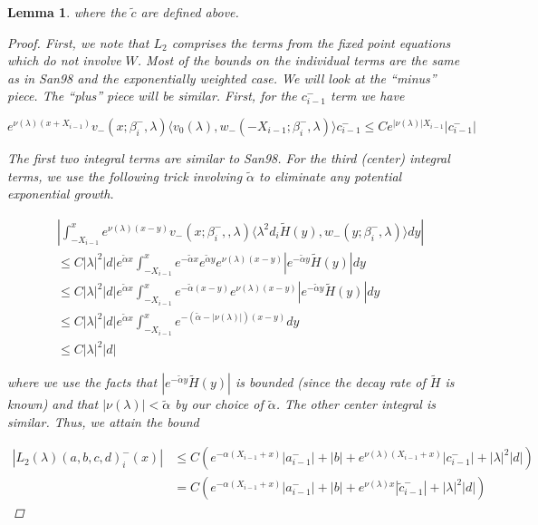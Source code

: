 \documentclass[12pt]{article}
\newtheorem{lemma}{Lemma}
\begin{document}
\begin{lemma}
where the $\tilde{c}$ are defined above.

\begin{proof}
First, we note that $L_2$ comprises the terms from the fixed point equations which do not involve $W$. Most of the bounds on the individual terms are the same as in San98 and the exponentially weighted case. We will look at the ``minus'' piece. The ``plus'' piece will be similar. First, for the $c_{i-1}^-$ term we have

\[
e^{\nu(\lambda)(x+X_{i-1})} v_-(x; \beta_i^-, \lambda) \langle v_0(\lambda), w_-(-X_{i-1}; \beta_i^-, \lambda) \rangle c_{i-1}^- \leq C e^{|\nu(\lambda)| X_{i-1} }|c_{i-1}^-|
\]

The first two integral terms are similar to San98. For the third (center) integral terms, we use the following trick involving $\tilde{\alpha}$ to eliminate any potential exponential growth.

\begin{align*}
&\left| \int_{-X_{i-1}}^x 
e^{\nu(\lambda)(x-y)} v_-(x; \beta_i^-, , \lambda) \langle \lambda^2 d_i \tilde{H}(y), w_-(y; \beta_i^-, \lambda) \rangle dy \right| \\
&\leq C |\lambda|^2 |d| e^{\tilde{\alpha}x} \int_{-X_{i-1}}^x e^{-\tilde{\alpha}x} e^{\tilde{\alpha}y} e^{\nu(\lambda)(x-y)} |e^{-\tilde{\alpha}y}\tilde{H}(y)|dy \\
&\leq C |\lambda|^2 |d| e^{\tilde{\alpha}x} \int_{-X_{i-1}}^x e^{-\tilde{\alpha}(x-y)} e^{\nu(\lambda)(x-y)} |e^{-\tilde{\alpha}y}\tilde{H}(y)| dy \\
&\leq C |\lambda|^2 |d| e^{\tilde{\alpha}x} \int_{-X_{i-1}}^x e^{-(\tilde{\alpha} - |\nu(\lambda)|)(x-y)} dy \\
&\leq C |\lambda|^2 |d|
\end{align*}

where we use the facts that $|e^{-\tilde{\alpha}y}\tilde{H}(y)|$ is bounded (since the decay rate of $\tilde{H}$ is known) and that $|\nu(\lambda)| < \tilde{\alpha}$ by our choice of $\tilde{\alpha}$. The other center integral is similar. Thus, we attain the bound 

\begin{align*}
|L_2(\lambda)(a,b,c,d)_i^-(x)| &\leq C (e^{-\alpha(X_{i-1} + x)}|a_{i-1}^-| + |b| + e^{\nu(\lambda)(X_{i-1} + x)} |c_{i-1}^-| + |\lambda|^2 |d| ) \\
&= C (e^{-\alpha(X_{i-1} + x)}|a_{i-1}^-| + |b| + e^{\nu(\lambda)x} |\tilde{c}_{i-1}^-| + |\lambda|^2 |d| ) 
\end{align*}


\end{proof}
\end{lemma}
\end{document}
